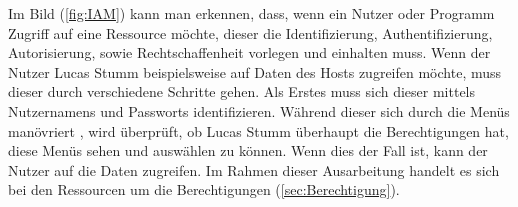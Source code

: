 Im Bild (\ref{fig:IAM}) kann man erkennen, dass, wenn ein Nutzer oder Programm Zugriff auf eine Ressource möchte, dieser die Identifizierung, Authentifizierung, Autorisierung, sowie Rechtschaffenheit vorlegen und einhalten muss. \cite{Moha19}
Wenn der Nutzer Lucas Stumm beispielsweise auf Daten des Hosts zugreifen möchte, muss dieser durch verschiedene Schritte gehen.
Als Erstes muss sich dieser mittels Nutzernamens und Passworts identifizieren.
Während dieser sich durch die Menüs manövriert , wird überprüft, ob Lucas Stumm überhaupt die Berechtigungen hat, diese Menüs sehen und auswählen zu können.
Wenn dies der Fall ist, kann der Nutzer auf die Daten zugreifen.
\newline
Im Rahmen dieser Ausarbeitung handelt es sich bei den Ressourcen um die Berechtigungen (\ref{sec:Berechtigung}).
